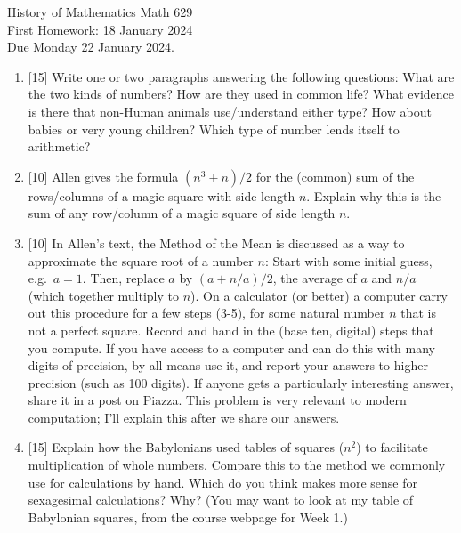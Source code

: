 \documentclass[12pt]{article}
\begin{document}
\LARGE 
\noindent
{\color{Maroon}History of Mathematics \hfill Math 629}\vspace{2pt}\\
\large
First Homework: \hfill 18 January 2024\\
Due Monday 22 January 2024.
\normalsize\vspace{10pt}

\begin{enumerate}

\item {[15]}
    Write one or two paragraphs answering the following questions: What are the two kinds of numbers? How are they used in common life? What
    evidence is there that non-Human animals use/understand either type? How about babies or very young children? Which type of number lends
    itself to arithmetic? 

\item {[10]}
      Allen gives the formula $(n^3+n)/2$ for the (common) sum of the rows/columns of a magic square with side length $n$.
      Explain why this is the sum of any row/column of a magic square of side length $n$.

\item {[10]}
    In Allen's text, the Method of the Mean is discussed as a way to approximate the square root of a number $n$: Start with some initial
    guess, e.g.\  $a=1$.
    Then, replace $a$ by $(a + n/a)/2$, the average of $a$ and $n/a$ (which together multiply to $n$). On a calculator (or better) a
    computer carry out this procedure for a few steps (3-5), for some natural number $n$ that is not a perfect square. Record and hand in the
    (base ten, digital) steps that you compute. If you have access to a computer and can do this with many digits of precision, by all means
    use it, and report your answers to higher precision (such as 100 digits). If anyone gets a particularly interesting answer, share it in
    a post on Piazza. This problem is very relevant to modern computation; I'll explain this after we share our answers.


    \item {[15]}
        Explain how the Babylonians used tables of squares ($n^2$) to facilitate multiplication of whole numbers. Compare this to the method we commonly use for calculations by hand. Which do you think makes more sense for sexagesimal calculations? Why?
        (You may want to look at my table of Babylonian squares, from the course webpage for Week 1.)
        
\end{enumerate}
\end{document}

